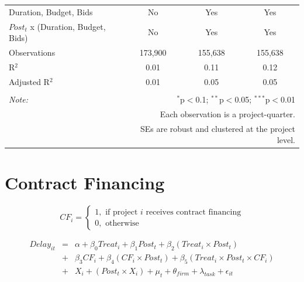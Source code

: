 \documentclass[
]{article}
\begin{document}
\begin{table}[H]
\begin{tabular}{@{\extracolsep{-2pt}}lccc}
Duration, Budget, Bids & No & Yes & Yes \\ 
$Post_t$  x  (Duration, Budget, Bids) & No & Yes & Yes \\ 
Observations & 173,900 & 155,638 & 155,638 \\ 
R$^{2}$ & 0.01 & 0.11 & 0.12 \\ 
Adjusted R$^{2}$ & 0.01 & 0.05 & 0.05 \\ 
\hline 
\hline \\[-1.8ex] 
\textit{Note:}  & \multicolumn{3}{r}{$^{*}$p$<$0.1; $^{**}$p$<$0.05; $^{***}$p$<$0.01} \\ 
 & \multicolumn{3}{r}{Each observation is a project-quarter.} \\ 
 & \multicolumn{3}{r}{SEs are robust and clustered at the project level.} \\ 
\end{tabular} 
\end{table}

\hypertarget{contract-financing}{%
\section{Contract Financing}\label{contract-financing}}

\[ CF_i = \begin{cases} 1, \text{ if project } i \text{ receives contract financing}\\
0, \text{ otherwise} \end{cases}\]

\[ \begin{aligned}
Delay_{it} &=& \alpha+\beta_0 Treat_i + \beta_1 Post_t + \beta_2 (Treat_i \times Post_t) \\
&+&\beta_3 CF_i + \beta_4 (CF_i \times Post_t) + \beta_5 (Treat_i \times Post_t \times CF_i) \\ 
&+&X_i + (Post_t \times X_i) + \mu_t + \theta_{firm} + \lambda_{task}+ \epsilon_{it}
\end{aligned}\]
\end{document}
